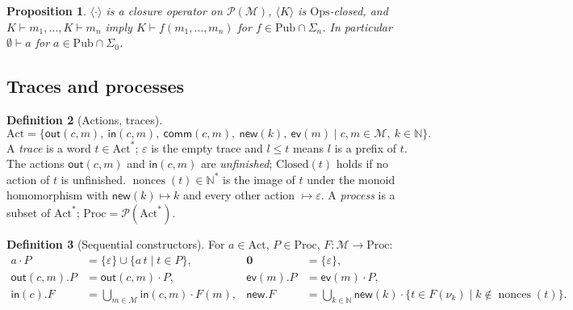 \documentclass[11pt]{article}
\theoremstyle{definition}
\newtheorem{definition}{Definition}[section]
\theoremstyle{plain}
\newtheorem{proposition}[definition]{Proposition}
\theoremstyle{remark}
\newcommand{\N}{\mathbb{N}}
\newcommand{\Msg}{\mathcal{M}}
\newcommand{\Ops}{\mathrm{Ops}}
\newcommand{\Pub}{\mathrm{Pub}}
\newcommand{\Act}{\mathrm{Act}}
\newcommand{\Proc}{\mathrm{Proc}}
\newcommand{\aout}{\mathsf{out}}
\newcommand{\ain}{\mathsf{in}}
\newcommand{\anew}{\mathsf{new}}
\newcommand{\aev}{\mathsf{ev}}
\newcommand{\acomm}{\mathsf{comm}}
\newcommand{\Closed}{\mathrm{Closed}}
\newcommand{\nonces}{\operatorname{nonces}}
\begin{document}
\begin{proposition}
$\langle\cdot\rangle$ is a closure operator on $\mathcal{P}(\Msg)$, $\langle K\rangle$ is $\Ops$-closed, and $K\vdash m_1,\dots,K\vdash m_n$ imply $K\vdash f(m_1,\dots,m_n)$ for $f\in\Pub\cap\Sigma_n$. In particular $\emptyset\vdash a$ for $a\in\Pub\cap\Sigma_0$.
\end{proposition}

\subsection{Traces and processes}

\begin{definition}[Actions, traces]
\[
\Act=\{\aout(c,m),\ \ain(c,m),\ \acomm(c,m),\ \anew(k),\ \aev(m)\mid c,m\in\Msg,\ k\in\N\}.
\]
A \emph{trace} is a word $t\in\Act^*$; $\varepsilon$ is the empty trace and $l\le t$ means $l$ is a prefix of $t$. The actions $\aout(c,m)$ and $\ain(c,m)$ are \emph{unfinished}; $\Closed(t)$ holds if no action of $t$ is unfinished. $\nonces(t)\in\N^*$ is the image of $t$ under the monoid homomorphism with $\anew(k)\mapsto k$ and every other action $\mapsto\varepsilon$. A \emph{process} is a subset of $\Act^*$; $\Proc=\mathcal{P}(\Act^*)$.
\end{definition}

\begin{definition}[Sequential constructors]\label{def:seq}
For $a\in\Act$, $P\in\Proc$, $F:\Msg\to\Proc$:
\begin{align*}
a\cdot P &= \{\varepsilon\}\cup\{a\,t\mid t\in P\}, &
\mathbf{0} &= \{\varepsilon\},\\
\aout(c,m).P &= \aout(c,m)\cdot P, &
\aev(m).P &= \aev(m)\cdot P,\\
\ain(c).F &= \textstyle\bigcup_{m\in\Msg}\ain(c,m)\cdot F(m), &
\anew.F &= \textstyle\bigcup_{k\in\N}\anew(k)\cdot\{t\in F(\nu_k)\mid k\notin\nonces(t)\}.
\end{align*}
\end{definition}
\end{document}
